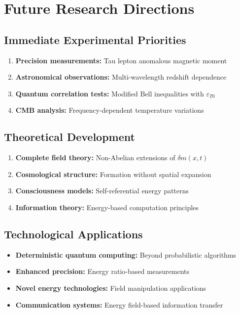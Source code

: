 \documentclass[12pt,a4paper]{report}
\begin{document}
	\section{Future Research Directions}
	
	\subsection{Immediate Experimental Priorities}
	\begin{enumerate}
		\item \textbf{Precision measurements:} Tau lepton anomalous magnetic moment
		\item \textbf{Astronomical observations:} Multi-wavelength redshift dependence
		\item \textbf{Quantum correlation tests:} Modified Bell inequalities with $\varepsilon_{T0}$
		\item \textbf{CMB analysis:} Frequency-dependent temperature variations
	\end{enumerate}
	
	\subsection{Theoretical Development}
	\begin{enumerate}
		\item \textbf{Complete field theory:} Non-Abelian extensions of $\delta m(x,t)$
		\item \textbf{Cosmological structure:} Formation without spatial expansion
		\item \textbf{Consciousness models:} Self-referential energy patterns
		\item \textbf{Information theory:} Energy-based computation principles
	\end{enumerate}
	
	\subsection{Technological Applications}
	\begin{itemize}
		\item \textbf{Deterministic quantum computing:} Beyond probabilistic algorithms
		\item \textbf{Enhanced precision:} Energy ratio-based measurements
		\item \textbf{Novel energy technologies:} Field manipulation applications
		\item \textbf{Communication systems:} Energy field-based information transfer
	\end{itemize}
	
\end{document}
